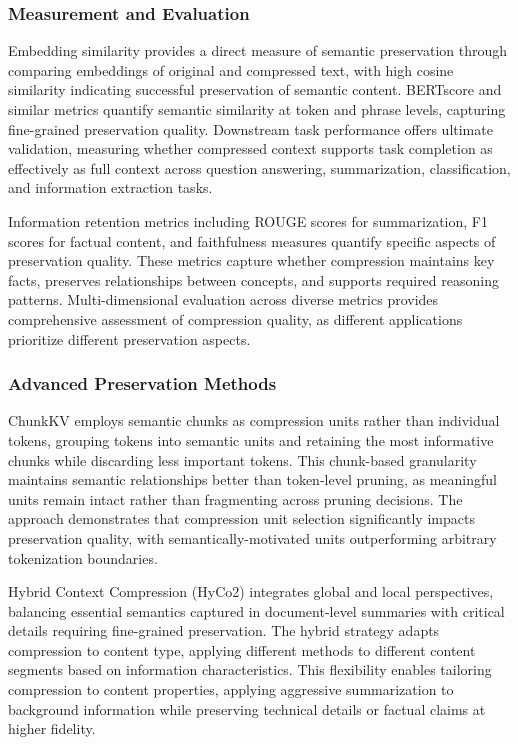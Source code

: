 \subsubsection{Measurement and Evaluation}

Embedding similarity provides a direct measure of semantic preservation through comparing embeddings of original and compressed text, with high cosine similarity indicating successful preservation of semantic content. BERTscore and similar metrics quantify semantic similarity at token and phrase levels, capturing fine-grained preservation quality. Downstream task performance offers ultimate validation, measuring whether compressed context supports task completion as effectively as full context across question answering, summarization, classification, and information extraction tasks.

Information retention metrics including ROUGE scores for summarization, F1 scores for factual content, and faithfulness measures quantify specific aspects of preservation quality. These metrics capture whether compression maintains key facts, preserves relationships between concepts, and supports required reasoning patterns. Multi-dimensional evaluation across diverse metrics provides comprehensive assessment of compression quality, as different applications prioritize different preservation aspects.

\subsubsection{Advanced Preservation Methods}

ChunkKV employs semantic chunks as compression units rather than individual tokens, grouping tokens into semantic units and retaining the most informative chunks while discarding less important tokens. This chunk-based granularity maintains semantic relationships better than token-level pruning, as meaningful units remain intact rather than fragmenting across pruning decisions. The approach demonstrates that compression unit selection significantly impacts preservation quality, with semantically-motivated units outperforming arbitrary tokenization boundaries.

Hybrid Context Compression (HyCo2) integrates global and local perspectives, balancing essential semantics captured in document-level summaries with critical details requiring fine-grained preservation. The hybrid strategy adapts compression to content type, applying different methods to different content segments based on information characteristics. This flexibility enables tailoring compression to content properties, applying aggressive summarization to background information while preserving technical details or factual claims at higher fidelity.

